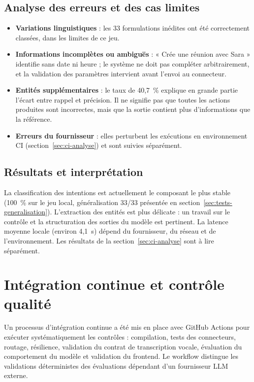 \documentclass[11pt,a4paper,openany,oneside]{report}
\newcommand{\intent}[1]{\texttt{\detokenize{#1}}}
\begin{document}
\subsection{Analyse des erreurs et des cas limites}
\begin{itemize}
\item \textbf{Variations linguistiques} : les 33 formulations inédites ont été correctement classées, dans les limites de ce jeu.
\item \textbf{Informations incomplètes ou ambiguës} : « Crée une réunion avec Sara » identifie \intent{create_event} sans date ni heure ; le système ne doit pas compléter arbitrairement, et la validation des paramètres intervient avant l'envoi au connecteur.
\item \textbf{Entités supplémentaires} : le taux de 40,7~\% explique en grande partie l'écart entre rappel et précision. Il ne signifie pas que toutes les actions produites sont incorrectes, mais que la sortie contient plus d'informations que la référence.
\item \textbf{Erreurs du fournisseur} : elles perturbent les exécutions en environnement CI (section~\ref{sec:ci-analyse}) et sont suivies séparément.
\end{itemize}

\subsection{Résultats et interprétation}
La classification des intentions est actuellement le composant le plus stable (100~\% sur le jeu local, généralisation 33/33 présentée en section~\ref{sec:tests-generalisation}). L'extraction des entités est plus délicate : un travail sur le contrôle et la structuration des sorties du modèle est pertinent. La latence moyenne locale (environ 4,1~s) dépend du fournisseur, du réseau et de l'environnement. Les résultats de la section~\ref{sec:ci-analyse} sont à lire séparément.

\section{Intégration continue et contrôle qualité}
Un processus d'intégration continue a été mis en place avec GitHub Actions pour exécuter systématiquement les contrôles : compilation, tests des connecteurs, routage, résilience, validation du contrat de transcription vocale, évaluation du comportement du modèle et validation du frontend. Le workflow distingue les validations déterministes des évaluations dépendant d'un fournisseur LLM externe.
\end{document}
